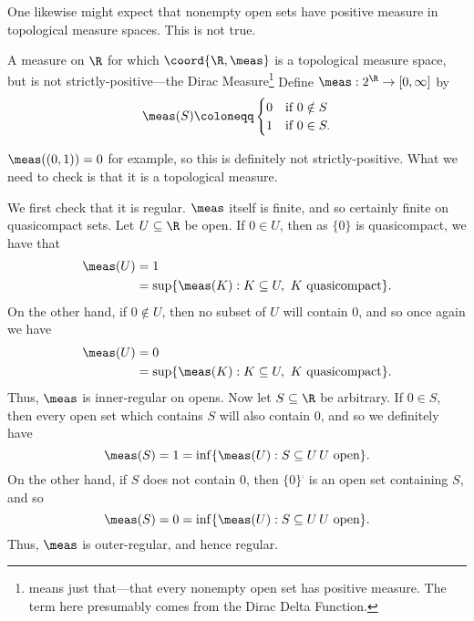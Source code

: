 One likewise might expect that nonempty open sets have positive measure in topological measure spaces.  This is not true.
\begin{exm}{A measure on $\R$ for which $\coord{\R ,\meas}$ is a topological measure space, but is not strictly-positive---the Dirac Measure}{}\footnote{ means just that---that every nonempty open set has positive measure.  The term here presumably comes from the Dirac Delta Function.}
Define $\meas :2^{\R}\rightarrow [0,\infty ]$ by
\begin{equation}
\meas (S)\coloneqq \begin{cases}0 & \text{if }0\notin S \\ 1 & \text{if }0\in S.\end{cases}
\end{equation}

$\meas ((0,1))=0$ for example, so this is definitely not strictly-positive.  What we need to check is that it is a topological measure.

We first check that it is regular.  $\meas$ itself is finite, and so certainly finite on quasicompact sets.  Let $U\subseteq \R$ be open.  If $0\in U$, then as $\{ 0\}$ is quasicompact, we have that
\begin{equation}
\begin{split}
\meas (U) & =1 \\
& =\sup \{ \meas (K):K\subseteq U,\ K\text{ quasicompact}\} .
\end{split}
\end{equation}
On the other hand, if $0\notin U$, then no subset of $U$ will contain $0$, and so once again we have
\begin{equation}
\begin{split}
\meas (U) & =0 \\
& =\sup \{ \meas (K):K\subseteq U,\ K\text{ quasicompact}\} .
\end{split}
\end{equation}
Thus, $\meas$ is inner-regular on opens.  Now let $S\subseteq \R$ be arbitrary.  If $0\in S$, then every open set which contains $S$ will also contain $0$, and so we definitely have
\begin{equation}
\meas (S)=1=\inf \{ \meas (U):S\subseteq U\, U\text{ open}\} .
\end{equation}
On the other hand, if $S$ does not contain $0$, then $\{ 0\} ^{\comp}$ is an open set containing $S$, and so
\begin{equation}
\meas (S)=0=\inf \{ \meas (U):S\subseteq U\, U\text{ open}\} .
\end{equation}
Thus, $\meas$ is outer-regular, and hence regular.


\end{exm}
